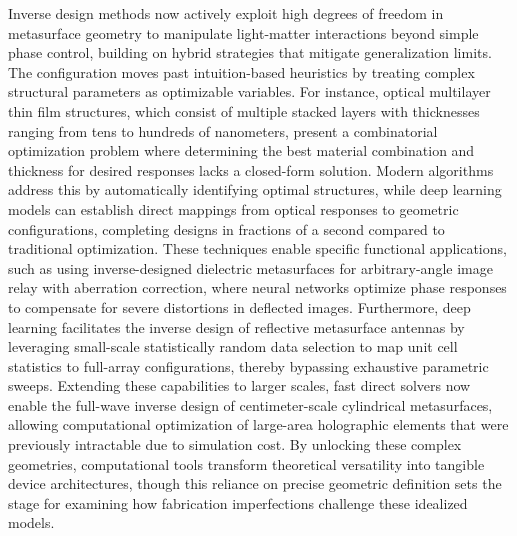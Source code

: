 \documentclass[11pt]{article}
\begin{document}
Inverse design methods now actively exploit high degrees of freedom in metasurface geometry to manipulate light-matter interactions beyond simple phase control, building on hybrid strategies that mitigate generalization limits. The configuration moves past intuition-based heuristics by treating complex structural parameters as optimizable variables. For instance, optical multilayer thin film structures, which consist of multiple stacked layers with thicknesses ranging from tens to hundreds of nanometers, present a combinatorial optimization problem where determining the best material combination and thickness for desired responses lacks a closed-form solution. Modern algorithms address this by automatically identifying optimal structures, while deep learning models can establish direct mappings from optical responses to geometric configurations, completing designs in fractions of a second compared to traditional optimization. These techniques enable specific functional applications, such as using inverse-designed dielectric metasurfaces for arbitrary-angle image relay with aberration correction, where neural networks optimize phase responses to compensate for severe distortions in deflected images. Furthermore, deep learning facilitates the inverse design of reflective metasurface antennas by leveraging small-scale statistically random data selection to map unit cell statistics to full-array configurations, thereby bypassing exhaustive parametric sweeps. Extending these capabilities to larger scales, fast direct solvers now enable the full-wave inverse design of centimeter-scale cylindrical metasurfaces, allowing computational optimization of large-area holographic elements that were previously intractable due to simulation cost. By unlocking these complex geometries, computational tools transform theoretical versatility into tangible device architectures, though this reliance on precise geometric definition sets the stage for examining how fabrication imperfections challenge these idealized models. \citep{doi_10_1016_j_isci_2025_112222_1f7c10f5} \citep{doi_10_1364_oe_519179_39046c11} \citep{doi_10_1002_mop_34068_b2e55b41} \citep{doi_10_1515_nanoph_2024_0127_c4fd5a12}
\end{document}
